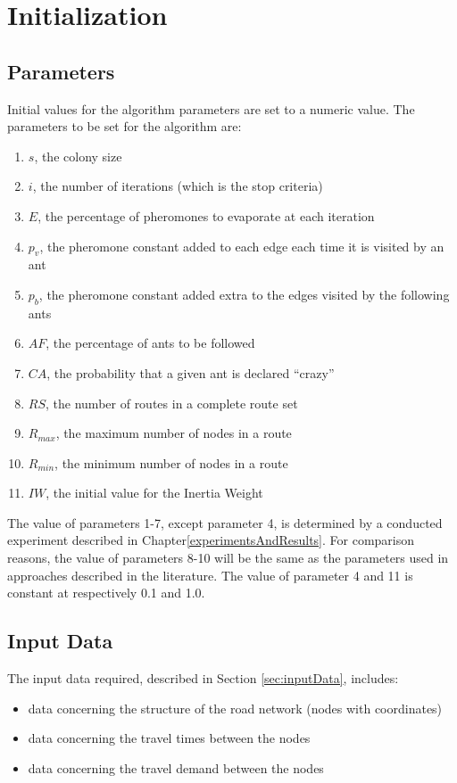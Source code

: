 \section{Initialization}
\label{sec:algoInitialization}
\subsection{Parameters}
Initial values for the algorithm parameters are set to a numeric value. The parameters to be set for the algorithm are:
\begin{enumerate}
\item $s$, the colony size
\item $i$, the number of iterations (which is the stop criteria)
\item $E$, the percentage of pheromones to evaporate at each iteration
\item $p_v$, the pheromone constant added to each edge each time it is visited by an ant
\item $p_b$, the pheromone constant added extra to the edges visited by the following ants 
\item $AF$, the percentage of ants to be followed
\item $CA$, the probability that a given ant is declared ``crazy''
\item $RS$, the number of routes in a complete route set 
\item $R_{max}$, the maximum number of nodes in a route
\item $R_{min}$, the minimum number of nodes in a route
\item $IW$, the initial value for the Inertia Weight
\end{enumerate}

The value of parameters 1-7, except parameter 4, is determined by a conducted experiment described in Chapter\vref{experimentsAndResults}. For comparison reasons, the value of parameters 8-10 will be the same as the parameters used in approaches described in the literature\citep{mandl79, kechagiopoulos14, nikolic14,kidwai98,fan10,chakroborty02,zhang10,chew12,baaj91, mumford13}. The value of parameter 4 and 11 is constant at respectively 0.1 and 1.0. 

\subsection{Input Data}
The input data required, described in Section \vref{sec:inputData}, includes:
\begin{itemize}
\item data concerning the structure of the road network (nodes with coordinates)
\item data concerning the travel times between the nodes
\item data concerning the travel demand between the nodes
\end{itemize}

